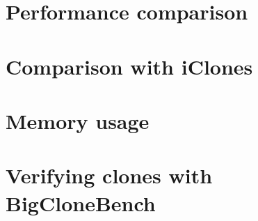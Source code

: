 
\section{Performance comparison}


\section{Comparison with iClones}

\section{Memory usage}

\section{Verifying clones with BigCloneBench}
